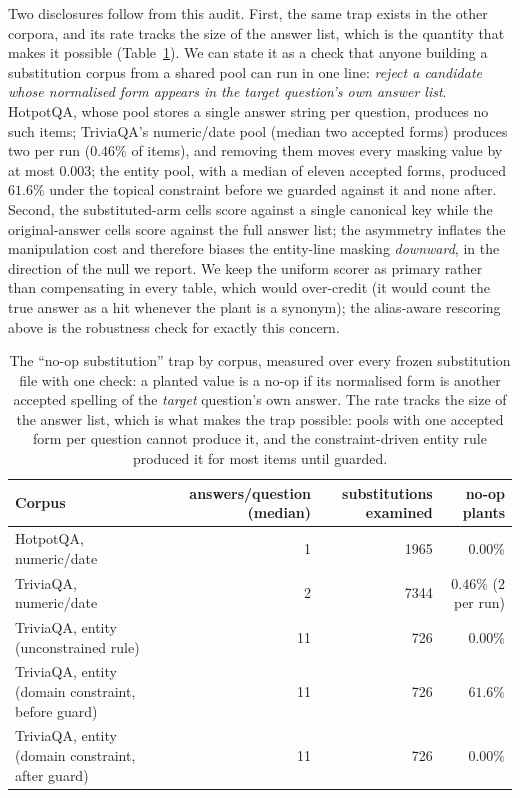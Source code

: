 \documentclass[11pt]{article}
\begin{document}
Two disclosures follow from this audit. First, the same trap exists in the other corpora,
and its rate tracks the size of the answer list, which is the quantity that makes it possible
(Table~\ref{tab:trap}). We can state it as a check that anyone building a substitution corpus
from a shared pool can run in one line: \emph{reject a candidate whose normalised form appears
in the target question's own answer list}. HotpotQA, whose pool stores a single answer string
per question, produces no such items; TriviaQA's numeric/date pool (median two accepted forms)
produces two per run ($0.46\%$ of items), and removing them moves every masking value by at
most $0.003$; the entity pool, with a median of eleven accepted forms, produced $61.6\%$ under the
topical constraint before we guarded against it and none after. Second, the substituted-arm
cells score against a single
canonical key while the original-answer cells score against the full answer list; the
asymmetry inflates the manipulation cost and therefore biases the entity-line masking
\emph{downward}, in the direction of the null we report. We keep the uniform scorer as
primary rather than compensating in every table, which would over-credit (it would count the
true answer as a hit whenever the plant is a synonym); the alias-aware rescoring above is the
robustness check for exactly this concern.

\begin{table}[t]\centering\small
\caption{The ``no-op substitution'' trap by corpus, measured over every frozen substitution
file with one check: a planted value is a no-op if its normalised form is another accepted
spelling of the \emph{target} question's own answer. The rate tracks the size of the answer
list, which is what makes the trap possible: pools with one accepted form per question cannot
produce it, and the constraint-driven entity rule produced it for most items until guarded.}
\label{tab:trap}
\begin{tabular}{lrrr}
\toprule
Corpus & answers/question (median) & substitutions examined & no-op plants \\
\midrule
HotpotQA, numeric/date & 1 & 1965 & $0.00\%$ \\
TriviaQA, numeric/date & 2 & 7344 & $0.46\%$ ($2$ per run) \\
TriviaQA, entity (unconstrained rule) & 11 & 726 & $0.00\%$ \\
TriviaQA, entity (domain constraint, before guard) & 11 & 726 & $61.6\%$ \\
TriviaQA, entity (domain constraint, after guard) & 11 & 726 & $0.00\%$ \\
\bottomrule
\end{tabular}
\end{table}
\end{document}

